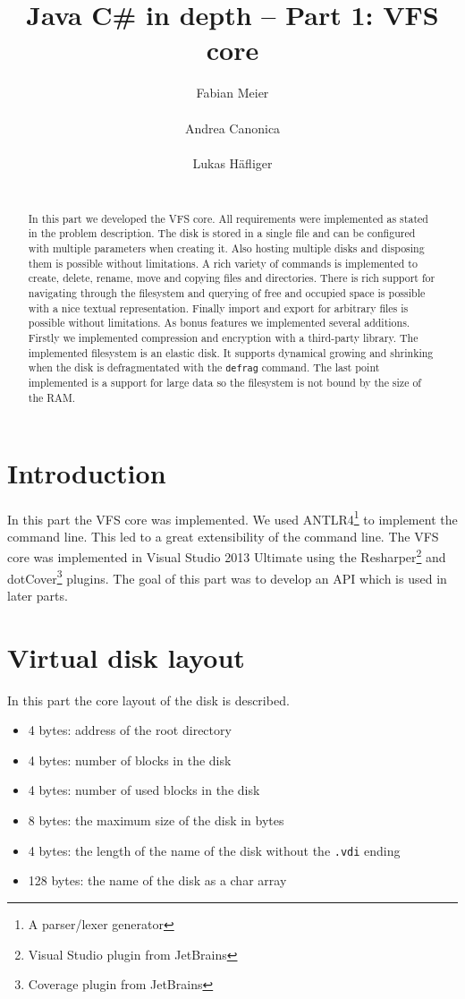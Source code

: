 \documentclass{report}
\title{Java C\# in depth -- Part 1: VFS core}
\author{
\alignauthor Fabian Meier\\
	\affaddr{ETH ID 10-919-280}\\
	\email{meiefabi@student.ethz.ch}
\alignauthor Andrea Canonica\\
	\affaddr{ETH ID 10-293-116}\\
	\email{canandre@student.ethz.ch}
\alignauthor Lukas H\"afliger\\
	\affaddr{ETH ID 11-916-376}\\
	\email{haelukas@student.ethz.ch}
}
\begin{document}
\maketitle

\begin{abstract}
In this part we developed the VFS core. All requirements were implemented as stated in the problem description. The disk is stored in a single file and can be configured with multiple parameters when creating it. Also hosting multiple disks and disposing them is possible without limitations. A rich variety of commands is implemented to create, delete, rename, move and copying files and directories. There is rich support for navigating through the filesystem and querying of free and occupied space is possible with a nice textual representation. Finally import and export for arbitrary files is possible without limitations. As bonus features we implemented several additions. Firstly we implemented compression and encryption with a third-party library. The implemented filesystem is an elastic disk. It supports dynamical growing and shrinking when the disk is defragmentated with the \texttt{defrag} command. The last point implemented is a support for large data so the filesystem is not bound by the size of the RAM.
\end{abstract}

\section{Introduction}
In this part the VFS core was implemented. We used ANTLR4\footnote{A parser/lexer generator} to implement the command line. This led to a great extensibility of the command line. The VFS core was implemented in Visual Studio 2013 Ultimate using the Resharper\footnote{Visual Studio plugin from JetBrains} and dotCover\footnote{Coverage plugin from JetBrains} plugins. The goal of this part was to develop an API which is used in later parts. 

\section{Virtual disk layout}
In this part the core layout of the disk is described. 
\begin{itemize}
\item 4 bytes: address of the root directory
\item 4 bytes: number of blocks in the disk
\item 4 bytes: number of used blocks in the disk
\item 8 bytes: the maximum size of the disk in bytes
\item 4 bytes: the length of the name of the disk without the \texttt{.vdi} ending
\item 128 bytes: the name of the disk as a char array
\end{itemize}
\end{document}

